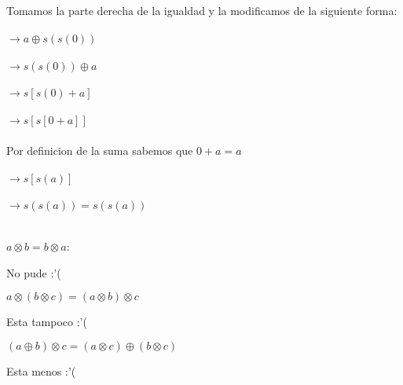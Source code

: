 \documentclass[]{article}
\begin{document}
\begin{center}
Tomamos la parte derecha de la igualdad y la modificamos de la siguiente forma:\\~\\
$\rightarrow a \oplus s(s(0))$\\~\\
$\rightarrow s(s(0)) \oplus a$\\~\\
$\rightarrow s[s(0)+a]$\\~\\
$\rightarrow s[s[0+a]]$\\~\\
Por definicion de la suma sabemos que $0+a=a$\\~\\
$\rightarrow s[s(a)]$\\~\\
$\rightarrow s(s(a)) = s(s(a))$\\~\\
\end{center}
\newpage
$a \otimes b = b \otimes a$:\\
\begin{center}
No pude :'(
\end{center}
$a \otimes (b \otimes c)=(a\otimes b)\otimes c$\\
\begin{center}
Esta tampoco :'(
\end{center}
$(a\oplus b)\otimes c = (a\otimes c) \oplus (b \otimes c)$
\begin{center}
Esta menos :'(
\end{center}
\end{document}
